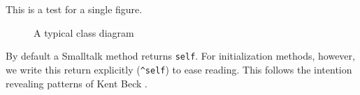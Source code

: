 \documentclass{article}
\begin{document}
This is a test for a single figure.

\begin{figure}
\vspace{7cm} \caption{A
typical class diagram}\label{fig:classDiagram}
\end{figure}
By default a Smalltalk method returns {\tt self}. For
initialization methods, however, we write this return explicitly
({\tt \^\/self}) to ease reading. This follows the intention
revealing patterns of Kent Beck \cite{Beck}.
\end{document}

